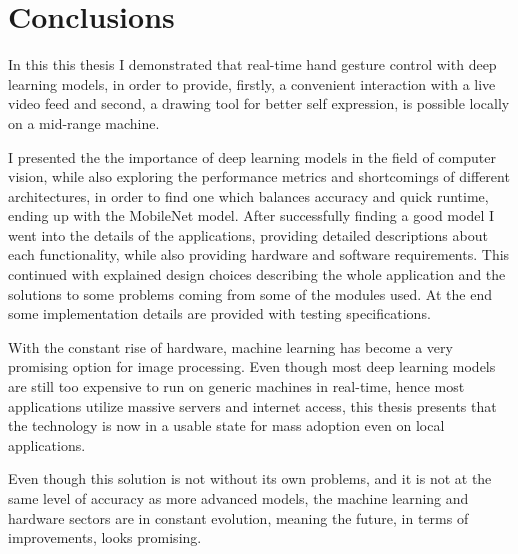\chapter{Conclusions}
\label{conclusions}

\par In this this thesis I demonstrated that real-time hand gesture control with deep learning models, in order to provide, firstly, a convenient interaction with a live video feed and second, a drawing tool for better self expression, is possible locally on a mid-range machine.
\par I presented the the importance of deep learning models in the field of computer vision, while also exploring the performance metrics and shortcomings of different architectures, in order to find one which balances accuracy and quick runtime, ending up with the MobileNet model. After successfully finding a good model I went into the details of the applications, providing detailed descriptions about each functionality, while also providing hardware and software requirements. This continued with explained design choices describing the whole application and the solutions to some problems coming from some of the modules used. At the end some implementation details are provided with testing specifications.
\par With the constant rise of hardware, machine learning has become a very promising option for image processing. Even though most deep learning models are still too expensive to run on generic machines in real-time, hence most applications utilize massive servers and internet access, this thesis presents that the technology is now in a usable state for mass adoption even on local applications.
\par Even though this solution is not without its own problems, and it is not at the same level of accuracy as more advanced models, the machine learning and hardware sectors are in constant evolution, meaning the future, in terms of improvements, looks promising.